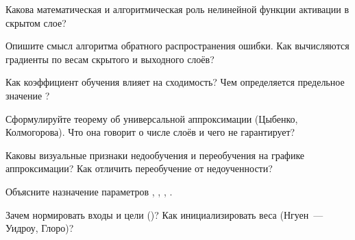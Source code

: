 \begin{questions}
\item Какова математическая и алгоритмическая роль нелинейной функции активации в скрытом слое?
\item Опишите смысл алгоритма обратного распространения ошибки. Как вычисляются градиенты по весам
скрытого и выходного слоёв?
\item Как коэффициент обучения влияет на сходимость? Чем определяется предельное значение ?
\item Сформулируйте теорему об универсальной аппроксимации (Цыбенко, Колмогорова). Что она говорит о
числе слоёв и чего не гарантирует?
\item Каковы визуальные признаки недообучения и переобучения на графике аппроксимации? Как отличить
переобучение от недоученности?
\item Объясните назначение параметров , , , .
\item Зачем нормировать входы и цели ()? Как инициализировать веса (Нгуен~---
Уидроу, Глоро)?
\end{questions}
